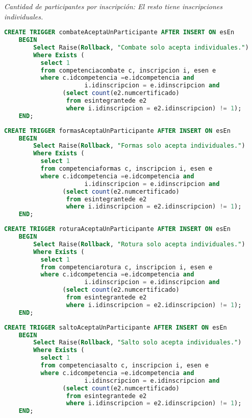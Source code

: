 \emph{Cantidad de participantes por inscripción: El resto tiene inscripciones individuales.}

\begin{lstlisting}[language=SQL]
CREATE TRIGGER combateAceptaUnParticipante AFTER INSERT ON esEn
    BEGIN
        Select Raise(Rollback, "Combate solo acepta individuales.")
        Where Exists (
          select 1
          from competenciacombate c, inscripcion i, esen e
          where c.idcompetencia =e.idcompetencia and
                      i.idinscripcion = e.idinscripcion and
                (select count(e2.numcertificado)
                 from esintegrantede e2
                 where i.idinscripcion = e2.idinscripcion) != 1);
    END;
\end{lstlisting}

\begin{lstlisting}[language=SQL]
CREATE TRIGGER formasAceptaUnParticipante AFTER INSERT ON esEn
    BEGIN
        Select Raise(Rollback, "Formas solo acepta individuales.")
        Where Exists (
          select 1
          from competenciaformas c, inscripcion i, esen e
          where c.idcompetencia =e.idcompetencia and
                      i.idinscripcion = e.idinscripcion and
                (select count(e2.numcertificado)
                 from esintegrantede e2
                 where i.idinscripcion = e2.idinscripcion) != 1);
    END;
\end{lstlisting}

\begin{lstlisting}[language=SQL]
CREATE TRIGGER roturaAceptaUnParticipante AFTER INSERT ON esEn
    BEGIN
        Select Raise(Rollback, "Rotura solo acepta individuales.")
        Where Exists (
          select 1
          from competenciarotura c, inscripcion i, esen e
          where c.idcompetencia =e.idcompetencia and
                      i.idinscripcion = e.idinscripcion and
                (select count(e2.numcertificado)
                 from esintegrantede e2
                 where i.idinscripcion = e2.idinscripcion) != 1);
    END;
\end{lstlisting}

\begin{lstlisting}[language=SQL]
CREATE TRIGGER saltoAceptaUnParticipante AFTER INSERT ON esEn
    BEGIN
        Select Raise(Rollback, "Salto solo acepta individuales.")
        Where Exists (
          select 1
          from competenciasalto c, inscripcion i, esen e
          where c.idcompetencia =e.idcompetencia and
                      i.idinscripcion = e.idinscripcion and
                (select count(e2.numcertificado)
                 from esintegrantede e2
                 where i.idinscripcion = e2.idinscripcion) != 1);
    END;
\end{lstlisting}


